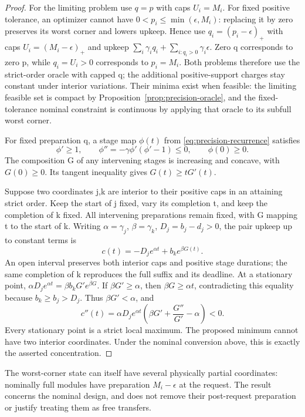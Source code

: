 \begin{proof}
For the limiting problem use $q=p$ with caps $U_i=M_i$. For fixed positive
tolerance, an optimizer cannot have $0<p_i\leq\min(\epsilon,M_i)$:
replacing it by zero preserves its worst corner and lowers upkeep. Hence
use $q_i=(p_i-\epsilon)_+$ with caps $U_i=(M_i-\epsilon)_+$ and upkeep
$\sum_i\gamma_iq_i+\sum_{i:q_i>0}\gamma_i\epsilon$.
Zero q corresponds to zero p, while $q_i=U_i>0$ corresponds to $p_i=M_i$.
Both problems therefore use the strict-order oracle with capped q; the
additional positive-support charges stay constant under interior variations.
Their minima exist when feasible: the limiting feasible set is compact
by Proposition~\ref{prop:precision-oracle}, and the fixed-tolerance
nominal constraint is continuous by applying that oracle to its subfull
worst corner.

For fixed preparation q, a stage map $\phi(t)$ from
\eqref{eq:precision-recurrence} satisfies
\[
 \phi'\geq1,\qquad
 \phi''=-\gamma\phi'(\phi'-1)\leq0,\qquad \phi(0)\geq0.
\]
The composition G of any intervening stages is increasing and concave,
with $G(0)\geq0$. Its tangent inequality gives $G(t)\geq tG'(t)$.

Suppose two coordinates j,k are interior to their positive caps in an
attaining strict order. Keep the start of j fixed, vary its completion t,
and keep the completion of k fixed. All intervening preparations remain
fixed, with G mapping t to the start of k. Writing
$\alpha=\gamma_j$, $\beta=\gamma_k$, $D_j=b_j-d_j>0$, the pair upkeep
up to constant terms is
\[
 c(t)=-D_j e^{\alpha t}+b_k e^{\beta G(t)}.
\]
An open interval preserves both interior caps and positive stage durations;
the same completion of k reproduces the full suffix and its deadline.
At a stationary point,
$\alpha D_j e^{\alpha t}=\beta b_k G'e^{\beta G}$.
If $\beta G'\geq\alpha$, then $\beta G\geq\alpha t$, contradicting
this equality because $b_k\geq b_j>D_j$. Thus $\beta G'<\alpha$, and
\[
 c''(t)=\alpha D_j e^{\alpha t}
       \left(\beta G'+\frac{G''}{G'}-\alpha\right)<0.
\]
Every stationary point is a strict local maximum. The proposed minimum
cannot have two interior coordinates. Under the nominal conversion above,
this is exactly the asserted concentration.
\end{proof}

The worst-corner state can itself have several physically partial
coordinates: nominally full modules have preparation $M_i-\epsilon$ at
the request. The result concerns the nominal design, and does not remove
their post-request preparation or justify treating them as free transfers.

